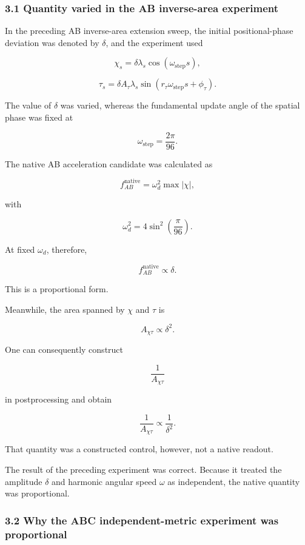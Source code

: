 \documentclass[
  a4paper,
]{article}
\begin{document}
\subsubsection{3.1 Quantity varied in the AB inverse-area
experiment}\label{quantity-varied-in-the-ab-inverse-area-experiment}

In the preceding AB inverse-area extension sweep, the initial
positional-phase deviation was denoted by \(\delta\), and the experiment
used

\[
\chi_s
=\delta\lambda_s\cos(\omega_{\mathrm{step}}s),
\]

\[
\tau_s
=\delta A_\tau\lambda_s
\sin(r_\tau\omega_{\mathrm{step}}s+\phi_\tau).
\]

The value of \(\delta\) was varied, whereas the fundamental update angle
of the spatial phase was fixed at

\[
\omega_{\mathrm{step}}
=\frac{2\pi}{96}.
\]

The native AB acceleration candidate was calculated as

\[
f_{AB}^{\mathrm{native}}
=\omega_d^2\max|\chi|,
\]

with

\[
\omega_d^2
=4\sin^2\left(\frac{\pi}{96}\right).
\]

At fixed \(\omega_d\), therefore,

\[
f_{AB}^{\mathrm{native}}\propto\delta.
\]

This is a proportional form.

Meanwhile, the area spanned by \(\chi\) and \(\tau\) is

\[
A_{\chi\tau}\propto\delta^2.
\]

One can consequently construct

\[
\frac{1}{A_{\chi\tau}}
\]

in postprocessing and obtain

\[
\frac{1}{A_{\chi\tau}}
\propto\frac{1}{\delta^2}.
\]

That quantity was a constructed control, however, not a native readout.

The result of the preceding experiment was correct. Because it treated
the amplitude \(\delta\) and harmonic angular speed \(\omega\) as
independent, the native quantity was proportional.

\subsubsection{3.2 Why the ABC independent-metric experiment was
proportional}\label{why-the-abc-independent-metric-experiment-was-proportional}
\end{document}
